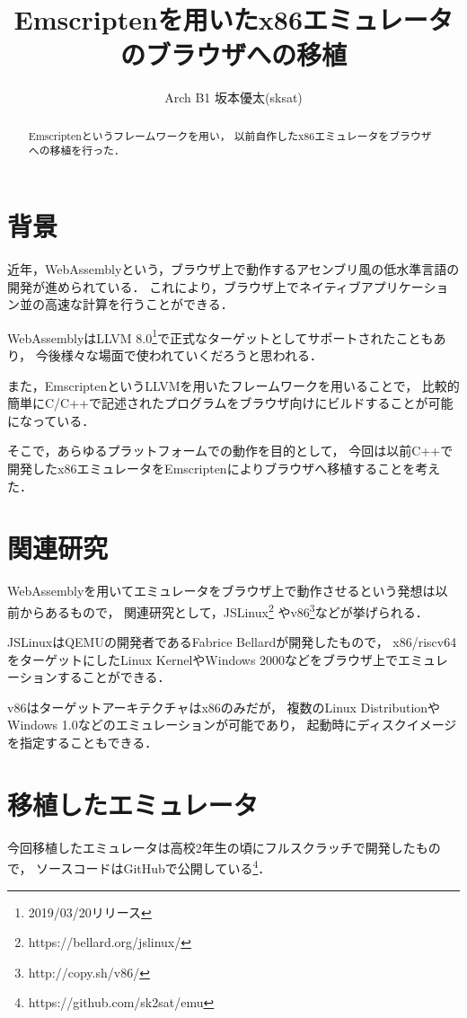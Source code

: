 \documentclass[a4j,10pt]{jsarticle}
\begin{document}

\title{Emscriptenを用いたx86エミュレータのブラウザへの移植}

\author{
	Arch B1 坂本優太(sksat)
}

\begin{abstract}
Emscriptenというフレームワークを用い，
以前自作したx86エミュレータをブラウザへの移植を行った．
\end{abstract}

\maketitle
\thispagestyle{empty}

\section{背景}
近年，WebAssemblyという，ブラウザ上で動作するアセンブリ風の低水準言語の開発が進められている．
これにより，ブラウザ上でネイティブアプリケーション並の高速な計算を行うことができる．

WebAssemblyはLLVM 8.0\footnote{2019/03/20リリース}で正式なターゲットとしてサポートされたこともあり，
今後様々な場面で使われていくだろうと思われる．

また，EmscriptenというLLVMを用いたフレームワークを用いることで，
比較的簡単にC/C++で記述されたプログラムをブラウザ向けにビルドすることが可能になっている．

そこで，あらゆるプラットフォームでの動作を目的として，
今回は以前C++で開発したx86エミュレータをEmscriptenによりブラウザへ移植することを考えた．

\section{関連研究}
WebAssemblyを用いてエミュレータをブラウザ上で動作させるという発想は以前からあるもので，
関連研究として，JSLinux\footnote{https://bellard.org/jslinux/}
やv86\footnote{http://copy.sh/v86/}などが挙げられる．

JSLinuxはQEMUの開発者であるFabrice Bellardが開発したもので，
x86/riscv64をターゲットにしたLinux KernelやWindows 2000などをブラウザ上でエミュレーションすることができる．

v86はターゲットアーキテクチャはx86のみだが，
複数のLinux DistributionやWindows 1.0などのエミュレーションが可能であり，
起動時にディスクイメージを指定することもできる．

\section{移植したエミュレータ}
今回移植したエミュレータは高校2年生の頃にフルスクラッチで開発したもので，
ソースコードはGitHubで公開している\footnote{https://github.com/sk2sat/emu}．
\end{document}
